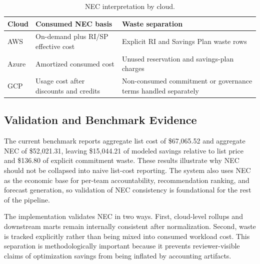 \begin{table}[t]
\caption{NEC interpretation by cloud.}
\label{tab:nec-terms}
\centering
\footnotesize
\begin{tabularx}{\columnwidth}{p{} p{} Y}
\toprule
\textbf{Cloud} & \textbf{Consumed NEC basis} & \textbf{Waste separation} \\
\midrule
AWS & On-demand plus RI/SP effective cost & Explicit RI and Savings Plan waste rows \\
Azure & Amortized consumed cost & Unused reservation and savings-plan charges \\
GCP & Usage cost after discounts and credits & Non-consumed commitment or governance terms handled separately \\
\bottomrule
\end{tabularx}
\end{table}

\subsection{Validation and Benchmark Evidence}
The current benchmark reports aggregate list cost of \$67{,}065.52 and aggregate NEC of \$52{,}021.31, leaving \$15{,}044.21 of modeled savings relative to list price and \$136.80 of explicit commitment waste. These results illustrate why NEC should not be collapsed into naive list-cost reporting. The system also uses NEC as the economic base for per-team accountability, recommendation ranking, and forecast generation, so validation of NEC consistency is foundational for the rest of the pipeline.

The implementation validates NEC in two ways. First, cloud-level rollups and downstream marts remain internally consistent after normalization. Second, waste is tracked explicitly rather than being mixed into consumed workload cost. This separation is methodologically important because it prevents reviewer-visible claims of optimization savings from being inflated by accounting artifacts.
